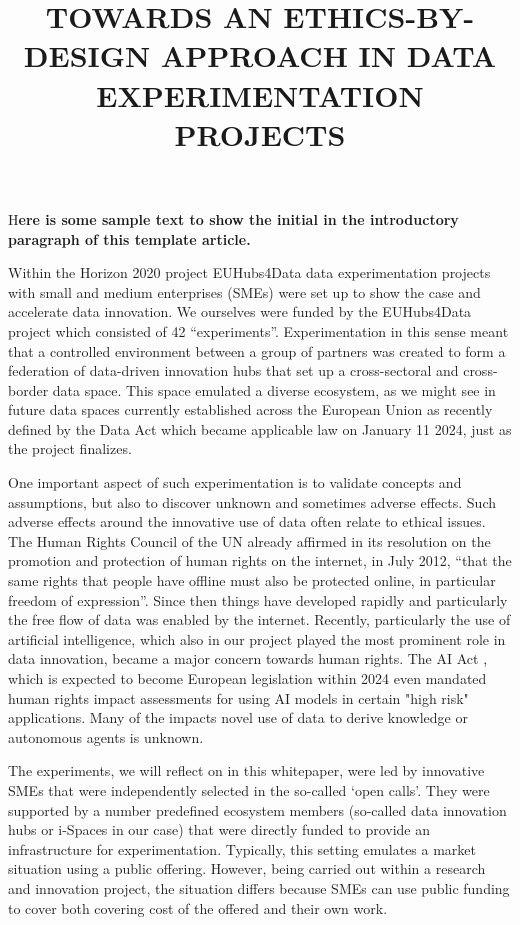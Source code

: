 \documentclass[	DIV=calc,%
							paper=a4,%
							fontsize=11pt,%
							twocolumn, draft]{scrartcl}	 					%
\title{TOWARDS AN ETHICS-BY-DESIGN APPROACH IN DATA EXPERIMENTATION PROJECTS}					%
\date{}																				%
\newcommand{\initial}[1]{%
     \lettrine[lines=3,lhang=0.3,nindent=0em]{
     				\color{DarkGoldenrod}
     				{\textsf{#1}}}{}}
\begin{document}
\maketitle
\initial{H}\textbf{ere is some sample text to show the initial in the introductory paragraph of this template article.}

Within the Horizon 2020 project EUHubs4Data \cite{EUH4D} data experimentation projects
with small and medium enterprises (SMEs) were
set up to show the case and accelerate data innovation. We ourselves
were funded by the EUHubs4Data project which consisted of 42
``experiments''. Experimentation in this sense
meant that a controlled environment between a group of partners was created to form a federation of data-driven innovation hubs
that set up a cross-sectoral and cross-border data space. 
This space emulated a diverse ecosystem, as we might see in future data spaces currently established across the European Union as recently defined by the Data Act \cite{} which became applicable law on January 11 2024, just as the project finalizes.

One important aspect of such experimentation is to validate concepts and assumptions, but also to discover unknown and sometimes adverse effects.
Such adverse effects around the innovative use of data often relate to ethical issues. The Human Rights Council of the UN already affirmed in its resolution on the promotion and protection of human rights on the internet, in July 2012, “that the same rights that people have offline must also be protected online, in particular freedom of expression”. Since then things have developed rapidly and particularly the free flow of data was enabled by the internet. Recently, particularly the use of artificial intelligence, which also in our project played the most prominent role in data innovation, became a major concern towards human rights. The AI Act \cite{AIAct}, which is expected to become European legislation within 2024 even mandated human rights impact assessments for using AI models in certain "high risk" applications. Many of the impacts novel use of data to derive knowledge or autonomous agents is unknown.

The experiments, we will reflect on in this whitepaper, were led by innovative SMEs that were
independently selected in the so-called `open calls'. They were supported by a number predefined ecosystem members (so-called data innovation hubs or i-Spaces
in our case) that were directly funded to provide an infrastructure for
experimentation. Typically, this setting emulates a market situation
using a public offering. However, being carried out within a research
and innovation project, the situation differs because SMEs can use
public funding to cover both covering cost of the offered and their own
work.
\end{document}
